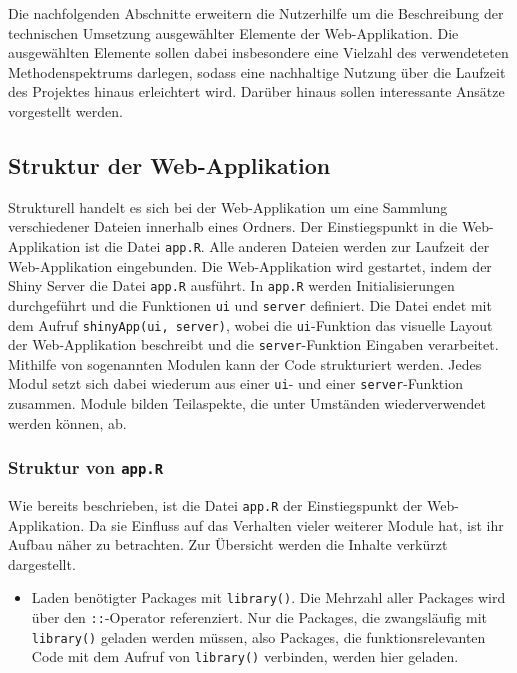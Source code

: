 \documentclass[
]{article}
\providecommand{\tightlist}{%
  \setlength{\itemsep}{0pt}\setlength{\parskip}{0pt}}
\begin{document}
Die nachfolgenden Abschnitte erweitern die Nutzerhilfe um die Beschreibung der technischen Umsetzung ausgewählter Elemente der Web-Applikation. Die ausgewählten Elemente sollen dabei insbesondere eine Vielzahl des verwendeteten Methodenspektrums darlegen, sodass eine nachhaltige Nutzung über die Laufzeit des Projektes hinaus erleichtert wird. Darüber hinaus sollen interessante Ansätze vorgestellt werden.

\hypertarget{struktur-der-web-applikation}{%
\subsection{Struktur der Web-Applikation}\label{struktur-der-web-applikation}}

Strukturell handelt es sich bei der Web-Applikation um eine Sammlung verschiedener Dateien innerhalb eines Ordners. Der Einstiegspunkt in die Web-Applikation ist die Datei \texttt{app.R}. Alle anderen Dateien werden zur Laufzeit der Web-Applikation eingebunden. Die Web-Applikation wird gestartet, indem der Shiny Server die Datei \texttt{app.R} ausführt. In \texttt{app.R} werden Initialisierungen durchgeführt und die Funktionen \texttt{ui} und \texttt{server} definiert. Die Datei endet mit dem Aufruf \texttt{shinyApp(ui,\ server)}, wobei die \texttt{ui}-Funktion das visuelle Layout der Web-Applikation beschreibt und die \texttt{server}-Funktion Eingaben verarbeitet. Mithilfe von sogenannten Modulen kann der Code strukturiert werden. Jedes Modul setzt sich dabei wiederum aus einer \texttt{ui}- und einer \texttt{server}-Funktion zusammen. Module bilden Teilaspekte, die unter Umständen wiederverwendet werden können, ab. \autocite{shiny-modules}

\hypertarget{struktur-von-app.r}{%
\subsubsection{\texorpdfstring{Struktur von \texttt{app.R}}{Struktur von app.R}}\label{struktur-von-app.r}}

Wie bereits beschrieben, ist die Datei \texttt{app.R} der Einstiegspunkt der Web-Applikation. Da sie Einfluss auf das Verhalten vieler weiterer Module hat, ist ihr Aufbau näher zu betrachten. Zur Übersicht werden die Inhalte verkürzt dargestellt.

\begin{itemize}
\tightlist
\item
  Laden benötigter Packages mit \texttt{library()}. Die Mehrzahl aller Packages wird über den \texttt{::}-Operator referenziert. Nur die Packages, die zwangsläufig mit \texttt{library()} geladen werden müssen, also Packages, die funktionsrelevanten Code mit dem Aufruf von \texttt{library()} verbinden, werden hier geladen.
\end{itemize}
\end{document}
